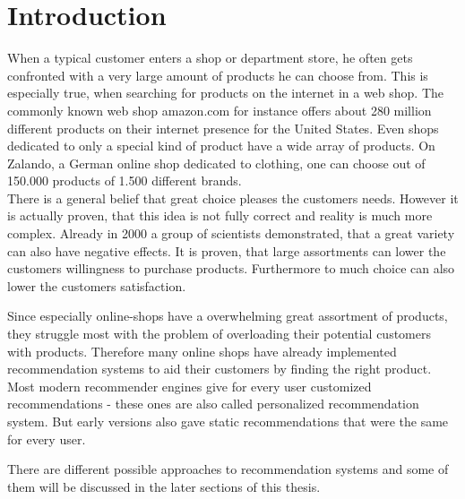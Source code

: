 
\section{Introduction}



When a typical customer enters a shop or department store, he often gets confronted with a very large amount of products he can choose from.
This is especially true, when searching for products on the internet in a web shop.
The commonly known web shop amazon.com for instance offers about 280 million different products on their internet presence for the United States.\citep{marketplaceanalytics:2014}
Even shops dedicated to only a special kind of product have a wide array of products.
On Zalando, a German online shop dedicated to clothing, one can choose out of 150.000 products of 1.500 different brands.\citep{visser:2014}\\
There is a general belief that great choice pleases the customers needs.
However it is actually proven, that this idea is not fully correct and reality is much more complex.
Already in 2000 a group of scientists demonstrated, that a great variety can also have negative effects.\citep[312]{diehl:2010}
It is proven, that large assortments can lower the customers willingness to purchase products.\citep[313]{diehl:2010}
Furthermore to much choice can also lower the customers satisfaction.\citep[320]{diehl:2010}


Since especially online-shops have a overwhelming great assortment of products, they struggle most with the problem of overloading their potential customers with products.
Therefore many online shops have already implemented recommendation systems to aid their customers by finding the right product.
Most modern recommender engines give for every user customized recommendations - these ones are also called personalized recommendation system.
But early versions also gave static recommendations that were the same for every user.\citep[1-2]{ricci:2011}




There are different possible approaches to recommendation systems and some of them will be discussed in the later sections of this thesis.









